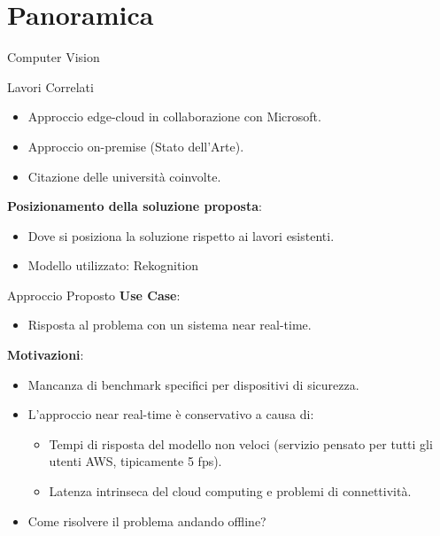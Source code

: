 \documentclass{beamer}
\begin{document}
\section{Panoramica}
\begin{frame}{Computer Vision}
\end{frame}
\begin{frame}{Lavori Correlati}
\begin{itemize}
    \item Approccio edge-cloud in collaborazione con Microsoft.
    \item Approccio on-premise (Stato dell'Arte).
    \item Citazione delle università coinvolte.
\end{itemize}

\textbf{Posizionamento della soluzione proposta}:
\begin{itemize}
    \item Dove si posiziona la soluzione rispetto ai lavori esistenti.
    \item Modello utilizzato: Rekognition
\end{itemize}
\end{frame}

\begin{frame}{Approccio Proposto}
\textbf{Use Case}:
\begin{itemize}
    \item Risposta al problema con un sistema near real-time.
\end{itemize}

\textbf{Motivazioni}:
\begin{itemize}
    \item Mancanza di benchmark specifici per dispositivi di sicurezza.
    \item L'approccio near real-time è conservativo a causa di:
    \begin{itemize}
        \item Tempi di risposta del modello non veloci (servizio pensato per tutti gli utenti AWS, tipicamente 5 fps).
        \item Latenza intrinseca del cloud computing e problemi di connettività.
    \end{itemize}
    \item Come risolvere il problema andando offline?
\end{itemize}
\end{frame}
\end{document}
